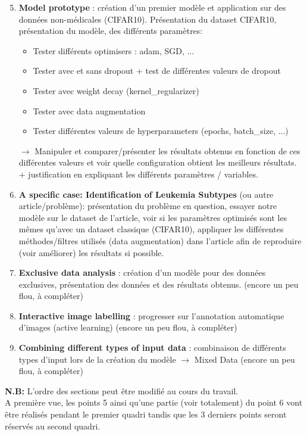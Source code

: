 \documentclass{article}
\begin{document}
\begin{enumerate}
\setcounter{enumi}{4}

\item \textbf{Model prototype} : création d'un premier modèle et application sur des données non-médicales (CIFAR10). Présentation du dataset CIFAR10, présentation du modèle, des différents paramètres: 

\begin{itemize}
\item Tester différents optimisers : adam, SGD, ...
\item Tester avec et sans dropout + test de différentes valeurs de dropout
\item Tester avec weight decay (kernel\_regularizer)
\item Tester avec data augmentation
\item Tester différentes valeurs de hyperparameters (epochs, batch\_size, ...) 
\end{itemize}

$\rightarrow$ Manipuler et comparer/présenter les résultats obtenus en fonction de ces différentes valeurs et voir quelle configuration obtient les meilleurs résultats. + justification en expliquant les différents paramètres / variables.    

\item \textbf{A specific case: Identification of Leukemia Subtypes} (ou autre article/problème): présentation du problème en question, essayer notre modèle sur le dataset de l'article, voir si les paramètres optimisés sont les mêmes qu'avec un dataset classique (CIFAR10), appliquer les différentes méthodes/filtres utilisés (data augmentation) dans l'article afin de reproduire (voir améliorer) les résultats si possible. 

\item \textbf{Exclusive data analysis} : création d'un modèle pour des données exclusives, présentation des données et des résultats obtenus. (encore un peu flou, à compléter)  

\item \textbf{Interactive image labelling} : progresser sur l’annotation automatique d’images (active learning) (encore un peu flou, à compléter)  

\item \textbf{Combining different types of input data} : combinaison de différents types d'input lors de la création du modèle $\rightarrow$ Mixed Data (encore un peu flou, à compléter)   


\end{enumerate}


\textbf{N.B:} L'ordre des sections peut être modifié au cours du travail. \\

A première vue, les points 5 ainsi qu'une partie (voir totalement) du point 6 vont être réalisés pendant le premier quadri tandis que les 3 derniers points seront réservés au second quadri. 
\end{document}
